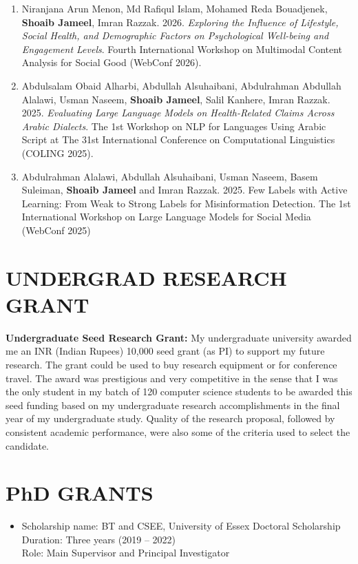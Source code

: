 \documentclass[margin]{res}
\begin{document}
\begin{resume}
\begin{enumerate}
\item Niranjana Arun Menon, Md Rafiqul Islam, Mohamed Reda Bouadjenek, \textbf{Shoaib Jameel}, Imran Razzak. 2026. \textit{Exploring the Influence of Lifestyle, Social Health, and Demographic Factors on Psychological Well-being and Engagement Levels}. Fourth International Workshop on Multimodal Content Analysis for Social Good (WebConf 2026).
\item Abdulsalam Obaid Alharbi, Abdullah Alsuhaibani, Abdulrahman Abdullah Alalawi, Usman Naseem, \textbf{Shoaib Jameel}, Salil Kanhere, Imran Razzak. 2025. \textit{Evaluating Large Language Models on Health-Related Claims Across Arabic Dialects}. The 1st Workshop on NLP for Languages Using Arabic Script at The 31st International Conference on Computational Linguistics (COLING 2025).
\item Abdulrahman Alalawi, Abdullah Alsuhaibani, Usman Naseem, Basem Suleiman, \textbf{Shoaib Jameel} and Imran Razzak. 2025. Few Labels with Active Learning: From Weak to Strong Labels for Misinformation Detection. The 1st International Workshop on  Large Language Models for Social Media (WebConf 2025)
\end{enumerate}

\section{UNDERGRAD RESEARCH GRANT} \textbf{Undergraduate Seed Research Grant:} My undergraduate university awarded me an INR (Indian Rupees) 10,000 seed grant (as PI) to support my future research. The grant could be used to buy research equipment or for conference travel. The award was prestigious and very competitive in the sense that I was the only student in my batch of 120 computer science students to be awarded this seed funding based on my undergraduate research accomplishments in the final year of my undergraduate study. Quality of the research proposal, followed by consistent academic performance, were also some of the criteria used to select the candidate.

\section{PhD GRANTS}
\begin{itemize}
    \item Scholarship name: BT and CSEE, University of Essex Doctoral Scholarship \\
    Duration: Three years (2019 -- 2022) \\
    Role: Main Supervisor and Principal Investigator
\end{itemize}


\end{resume}
\end{document}
